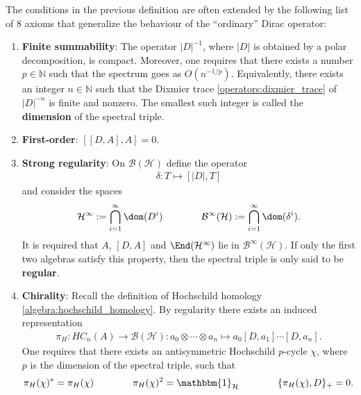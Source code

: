     \begin{remark}
        The conditions in the previous definition are often extended by the following list of 8 axioms that generalize the behaviour of the ``ordinary'' Dirac operator:
        \begin{enumerate}
            \item\textbf{Finite summability}: The operator $|D|^{-1}$, where $|D|$ is obtained by a polar decomposition, is compact. Moreover, one requires that there exists a number $p\in\mathbb{N}$ such that the spectrum goes as $O(n^{-1/p})$. Equivalently, there exists an integer $n\in\mathbb{N}$ such that the Dixmier trace \ref{operators:dixmier_trace} of $|D|^{-n}$ is finite and nonzero. The smallest such integer is called the \textbf{dimension} of the spectral triple.
            \item\textbf{First-order}: $[[D,A],A]=0$.
            \item\textbf{Strong regularity}: On $\mathcal{B}(\mathcal{H})$ define the operator
            \begin{gather}
                \delta:T\mapsto[|D|,T]
            \end{gather}
            and consider the spaces
            \begin{gather}
                \mathcal{H}^\infty:=\bigcap_{i=1}^\infty\dom(D^i)\qquad\qquad\mathcal{B}^\infty(\mathcal{H}):=\bigcap_{i=1}^\infty\dom(\delta^i).
            \end{gather}
            It is required that $A$, $[D,A]$ and $\End(\mathcal{H}^\infty)$ lie in $\mathcal{B}^\infty(\mathcal{H})$. If only the first two algebras satisfy this property, then the spectral triple is only said to be \textbf{regular}.
            \item\textbf{Chirality}: Recall the definition of Hochschild homology \ref{algebra:hochschild_homology}. By regularity there exists an induced representation
            \begin{gather}
                \pi_H:HC_n(A)\rightarrow\mathcal{B}(\mathcal{H}):a_0\otimes\cdots\otimes a_n\mapsto a_0[D,a_1]\cdots[D,a_n].
            \end{gather}
            One requires that there exists an antisymmetric Hochschild $p$-cycle $\chi$, where $p$ is the dimension of the spectral triple, such that
            \begin{gather}
                \pi_H(\chi)^*=\pi_H(\chi)\qquad\qquad\pi_H(\chi)^2=\mathbbm{1}_\mathcal{H}\qquad\qquad\{\pi_H(\chi),D\}_+=0.
            \end{gather}

\end{enumerate}
\end{remark}
